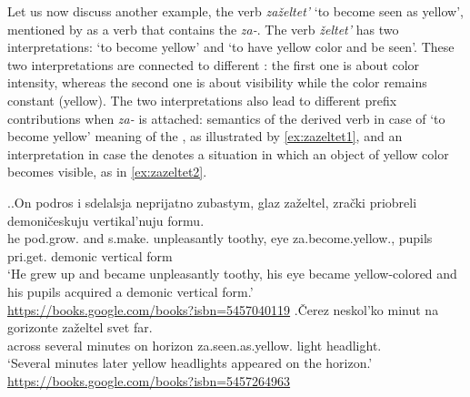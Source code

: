 Let us now discuss another example, the verb \textit{za\v{z}eltet'} `to become seen as yellow', mentioned by \citet{Braginsky:08} as a verb that contains the  {\textit{za-}.} The verb \textit{\v{z}eltet'} has two interpretations: `to become yellow' and `to have yellow color and be seen'. These two interpretations are connected to different  : the first one is about color intensity, whereas the second one is about visibility while the color remains constant (yellow). The two interpretations also lead to different prefix contributions when \textit{za-} is attached:  semantics of the derived verb in case of `to become yellow' meaning of the , as illustrated by \ref{ex:zazeltet1}, and an  interpretation in case the  denotes a  situation in which an object of yellow color becomes visible, as in \ref{ex:zazeltet2}.


\ex.\label{ex:zazeltet}\ag.\label{ex:zazeltet1}On podros i sdelalsja neprijatno zubastym, glaz za\v{z}eltel, zra\v{c}ki priobreli demoni\v{c}eskuju vertikal'nuju formu.\\
he pod.grow. and s.make. unpleasantly toothy, eye za.become.yellow., pupils pri.get. demonic vertical form\\
`He grew up and became unpleasantly toothy, his eye became yellow-colored and his pupils acquired a demonic vertical form.'\\\hbox{}\hfill\hbox{\url{https://books.google.com/books?isbn=5457040119}}
\bg.\label{ex:zazeltet2}\v{C}erez neskol'ko minut na gorizonte za\v{z}eltel svet far.\\
across several minutes on horizon za.seen.as.yellow. light headlight.\\
`Several minutes later yellow headlights appeared on the horizon.'\\\hbox{}\hfill\hbox{\url{https://books.google.com/books?isbn=5457264963}}

